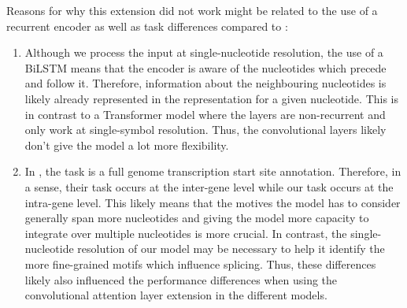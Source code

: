 Reasons for why this extension did not work might be related to the use of a recurrent encoder as well as task differences compared to \cite{ghentransformers}:
\begin{enumerate}
	\item Although we process the input at single-nucleotide resolution, the use of a BiLSTM means that the encoder is aware of the nucleotides which precede and follow it. Therefore, information about the neighbouring nucleotides is likely already represented in the representation for a given nucleotide. This is in contrast to a Transformer model where the layers are non-recurrent and only work at single-symbol resolution. Thus, the convolutional layers likely don't give the model a lot more flexibility.
	\item In \cite{ghentransformers}, the task is a full genome transcription start site annotation. Therefore, in a sense, their task occurs at the inter-gene level while our task occurs at the intra-gene level. This likely means that the motives the model has to consider generally span more nucleotides and giving the model more capacity to integrate over multiple nucleotides is more crucial. In contrast, the single-nucleotide resolution of our model may be necessary to help it identify the more fine-grained motifs which influence splicing. Thus, these differences likely also influenced the performance differences when using the convolutional attention layer extension in the different models.
\end{enumerate}


